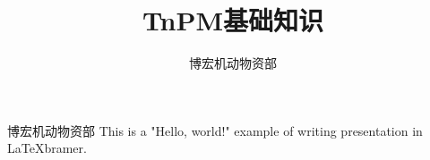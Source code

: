 \documentclass{beamer}
\begin{document}
\title{TnPM基础知识}
\author{博宏机动物资部}

\begin{frame}
  \titlepage
\end{frame}

\begin{frame}{博宏机动物资部}
  This is a "Hello, world!" example of writing presentation in \LaTeX bramer.
\end{frame}
\end{document}
